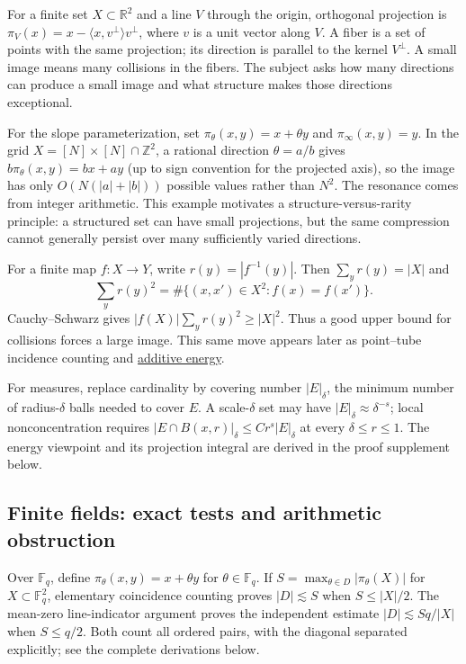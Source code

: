 For a finite set \(X\subset\mathbb R^2\) and a line \(V\) through the origin, orthogonal projection is \(\pi_V(x)=x-\langle x,v^\perp\rangle v^\perp\), where \(v\) is a unit vector along \(V\). A fiber is a set of points with the same projection; its direction is parallel to the kernel \(V^\perp\). A small image means many collisions in the fibers. The subject asks how many directions can produce a small image and what structure makes those directions exceptional.

For the slope parameterization, set \(\pi_\theta(x,y)=x+\theta y\) and \(\pi_\infty(x,y)=y\). In the grid \(X=[N]\times[N]\cap\mathbb Z^2\), a rational direction \(\theta=a/b\) gives \(b\pi_\theta(x,y)=bx+ay\) (up to sign convention for the projected axis), so the image has only \(O(N(|a|+|b|))\) possible values rather than \(N^2\). The resonance comes from integer arithmetic. This example motivates a structure-versus-rarity principle: a structured set can have small projections, but the same compression cannot generally persist over many sufficiently varied directions.

For a finite map \(f:X\to Y\), write \(r(y)=|f^{-1}(y)|\). Then \(\sum_y r(y)=|X|\) and \[\sum_y r(y)^2=\#\{(x,x')\in X^2:f(x)=f(x')\}.\] Cauchy--Schwarz gives \(|f(X)|\sum_y r(y)^2\ge |X|^2\). Thus a good upper bound for collisions forces a large image. This same move appears later as point--tube incidence counting and \hyperref[appendix-b0732b22e7d6]{additive energy}.

For measures, replace cardinality by covering number \(|E|_\delta\), the minimum number of radius-\(\delta\) balls needed to cover \(E\). A scale-\(\delta\) set may have \(|E|_\delta\approx\delta^{-s}\); local nonconcentration requires \(|E\cap B(x,r)|_\delta\le Cr^s|E|_\delta\) at every \(\delta\le r\le1\). The energy viewpoint and its projection integral are derived in the proof supplement below.

\subsection{Finite fields: exact tests and arithmetic obstruction}\label{04-visual-computing-ii-ch032-finite-fields-exact-tests-and-arithmetic-obstruction}

Over \(\mathbb F_q\), define \(\pi_\theta(x,y)=x+\theta y\) for \(\theta\in\mathbb F_q\). If \(S=\max_{\theta\in D}|\pi_\theta(X)|\) for \(X\subset\mathbb F_q^2\), elementary coincidence counting proves \(|D|\lesssim S\) when \(S\le|X|/2\). The mean-zero line-indicator argument proves the independent estimate \(|D|\lesssim Sq/|X|\) when \(S\le q/2\). Both count all ordered pairs, with the diagonal separated explicitly; see the complete derivations below.

